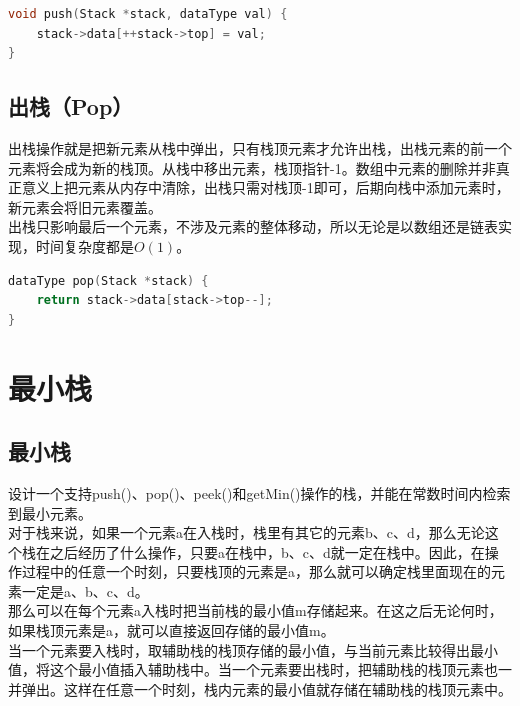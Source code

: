 
\begin{lstlisting}[language=C]
void push(Stack *stack, dataType val) {
    stack->data[++stack->top] = val;
}
\end{lstlisting}

\subsection{出栈（Pop）}

出栈操作就是把新元素从栈中弹出，只有栈顶元素才允许出栈，出栈元素的前一个元素将会成为新的栈顶。从栈中移出元素，栈顶指针-1。数组中元素的删除并非真正意义上把元素从内存中清除，出栈只需对栈顶-1即可，后期向栈中添加元素时，新元素会将旧元素覆盖。 \\

出栈只影响最后一个元素，不涉及元素的整体移动，所以无论是以数组还是链表实现，时间复杂度都是$ O(1) $。 \\


\begin{lstlisting}[language=C]
dataType pop(Stack *stack) {
    return stack->data[stack->top--];
}
\end{lstlisting}

\newpage

\section{最小栈}

\subsection{最小栈}

设计一个支持push()、pop()、peek()和getMin()操作的栈，并能在常数时间内检索到最小元素。 \\

对于栈来说，如果一个元素a在入栈时，栈里有其它的元素b、c、d，那么无论这个栈在之后经历了什么操作，只要a在栈中，b、c、d就一定在栈中。因此，在操作过程中的任意一个时刻，只要栈顶的元素是a，那么就可以确定栈里面现在的元素一定是a、b、c、d。 \\

那么可以在每个元素a入栈时把当前栈的最小值m存储起来。在这之后无论何时，如果栈顶元素是a，就可以直接返回存储的最小值m。 \\

当一个元素要入栈时，取辅助栈的栈顶存储的最小值，与当前元素比较得出最小值，将这个最小值插入辅助栈中。当一个元素要出栈时，把辅助栈的栈顶元素也一并弹出。这样在任意一个时刻，栈内元素的最小值就存储在辅助栈的栈顶元素中。 \\

